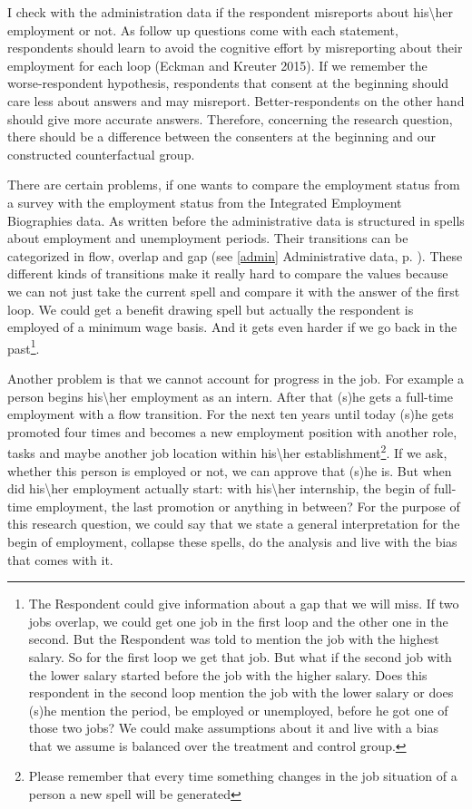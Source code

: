 I check with the administration data if the respondent misreports about his\textbackslash her employment or not. As follow up questions come with each statement, respondents should learn to avoid the cognitive effort by misreporting about their employment for each loop (Eckman and Kreuter 2015). If we remember the worse-respondent hypothesis, respondents that consent at the beginning should care less about answers and may misreport. Better-respondents on the other hand should give more accurate answers. Therefore, concerning the research question, there should be a difference between the consenters at the beginning and our constructed counterfactual group.

There are certain problems, if one wants to compare the employment status from a survey with the employment status from the Integrated Employment Biographies data. As written before the administrative data is structured in spells about employment and unemployment periods. Their transitions can be categorized in flow, overlap and gap (see \ref{admin} Administrative data, p. \pageref{admin}). These different kinds of transitions make it really hard to compare the values because we can not just take the current spell and compare it with the answer of the first loop. We could get a benefit drawing spell but actually the respondent is employed of a minimum wage basis. And it gets even harder if we go back in the past\footnote{The Respondent could give information about a gap that we will miss. If two jobs overlap, we could get one job in the first loop and the other one in the second. But the Respondent was told to mention the job with the highest salary. So for the first loop we get that job. But what if the second job with the lower salary started before the job with the higher salary. Does this respondent in the second loop mention the job with the lower salary or does (s)he mention the period, be employed or unemployed, before he got one of those two jobs? We could make assumptions about it and live with a bias that we assume is balanced over the treatment and control group.}.

Another problem is that we cannot account for progress in the job. For example a person begins his\textbackslash her employment as an intern. After that (s)he gets a full-time employment with a flow transition. For the next ten years until today (s)he gets promoted four times and becomes a new employment position with another role, tasks and maybe another job location within his\textbackslash her establishment\footnote{Please remember that every time something changes in the job situation of a person a new spell will be generated}. If we ask, whether this person is employed or not, we can approve that (s)he is. But when did his\textbackslash her employment actually start: with his\textbackslash her internship, the begin of full-time employment, the last promotion or anything in between? For the purpose of this research question, we could say that we state a general interpretation for the begin of employment, collapse these spells, do the analysis and live with the bias that comes with it. 

